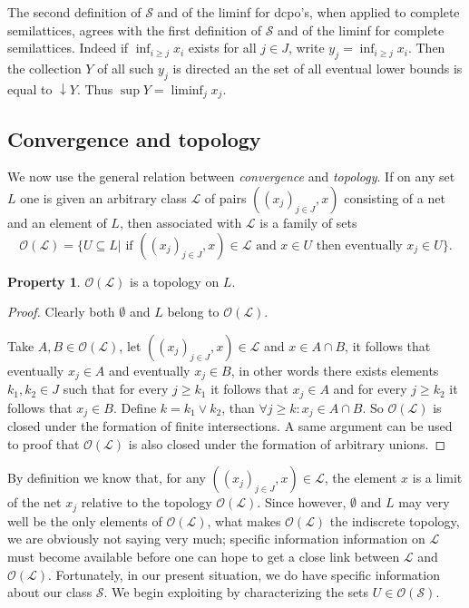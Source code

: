 \documentclass[a4paper,12pt]{article}
\theoremstyle{definition}
\newtheorem{property}[theorem]{Property}
\begin{document}
The second definition of $\mathcal{S}$ and of the liminf for dcpo's, when applied to complete semilattices, agrees with the first definition of $\mathcal{S}$ and of the liminf for complete semilattices. Indeed if $\inf_{i \geq j}x_i$ exists for all $j \in J$, write $y_j = \inf_{i \geq j} x_i$. Then the collection $Y$ of all such $y_j$ is directed an the set of all eventual lower bounds is equal to $\downarrow Y$. Thus $\sup Y = \liminf_j x_j$.

\subsection{Convergence and topology}
We now use the general relation between \emph{convergence} and \emph{topology}. If on any set $L$ one is given an arbitrary class $\mathcal{L}$ of pairs $((x_j)_{j\in J}, x)$ consisting of a net and an element of $L$, then associated with $\mathcal{L}$ is a family of sets
$$\mathcal{O}(\mathcal{L}) = \{U \subseteq L | \text{ if } ((x_j)_{j\in J}, x) \in \mathcal{L} \text{ and } x \in U \text{ then eventually } x_j \in U\}.$$

\begin{property}
$\mathcal{O}(\mathcal{L})$ is a topology on $L$.
\end{property}
\begin{proof}
Clearly both $\emptyset$ and $L$ belong to $\mathcal{O}(\mathcal{L})$.

Take $A, B \in \mathcal{O}(\mathcal{L})$, let $((x_j)_{j\in J}, x) \in \mathcal{L}$ and $x \in A \cap B$, it follows that eventually $x_j \in A$ and eventually $x_j \in B$, in other words there exists elements $k_1, k_2 \in J$  such that for every $j \geq k_1$ it follows that $x_j \in A$ and for every $j \geq k_2$ it follows that $x_j \in B$. Define $k = k_1 \vee k_2$, than $\forall j \geq k: x_j \in A \cap B$. So $\mathcal{O}(\mathcal{L})$ is closed under the formation of finite intersections. A same argument can be used to proof that $\mathcal{O}(\mathcal{L})$ is also closed under the formation of arbitrary unions.
\end{proof}

By definition we know that, for any $((x_j)_{j\in J}, x) \in \mathcal{L}$, the element $x$ is a limit of the net $x_j$ relative to the topology $\mathcal{O}(\mathcal{L})$. Since however, $\emptyset$ and $L$ may very well be the only elements of $\mathcal{O}(\mathcal{L})$, what makes $\mathcal{O}(\mathcal{L})$ the indiscrete topology, we are obviously not saying very much; specific information information on $\mathcal{L}$ must become available before one can hope to get a close link between $\mathcal{L}$ and $\mathcal{O}(\mathcal{L})$. Fortunately, in our present situation, we do have specific information about our class $\mathcal{S}$. We begin exploiting by characterizing the sets $U \in \mathcal{O}(\mathcal{S})$.
\end{document}
